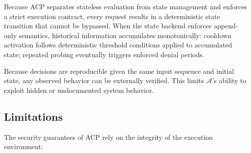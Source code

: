 \documentclass[11pt]{article}
\theoremstyle{definition}
\begin{document}
Because ACP separates stateless evaluation from state management and enforces a strict
execution contract, every request results in a deterministic state transition that cannot
be bypassed.
When the state backend enforces append-only semantics, historical information accumulates
monotonically: cooldown activation follows deterministic threshold conditions applied to
accumulated state; repeated probing eventually triggers enforced denial periods.

Because decisions are reproducible given the same input sequence and initial state,
any observed behavior can be externally verified.
This limits $\mathcal{A}$'s ability to exploit hidden or undocumented system behavior.

\subsection{Limitations}

The security guarantees of ACP rely on the integrity of the execution environment:
\end{document}

